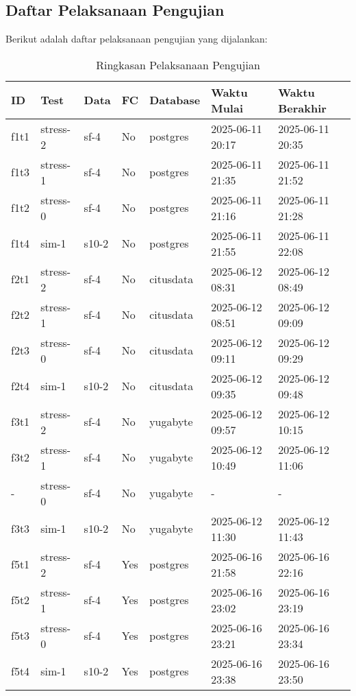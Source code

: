 \subsection{Daftar Pelaksanaan Pengujian}

Berikut adalah daftar pelaksanaan pengujian yang dijalankan:

\begin{table}[htbp]
    \centering
    \caption{Ringkasan Pelaksanaan Pengujian}
    \label{tab:execution-summary}
    \begin{tabular}{|l|l|l|l|l|l|l|}
        \hline
        \textbf{ID} & \textbf{Test} & \textbf{Data} & \textbf{FC} & \textbf{Database} & \textbf{Waktu Mulai} & \textbf{Waktu Berakhir} \\ \hline
        f1t1 & stress-2 & sf-4 & No & postgres & 2025-06-11 20:17 & 2025-06-11 20:35 \\ \hline
        f1t3 & stress-1 & sf-4 & No & postgres & 2025-06-11 21:35 & 2025-06-11 21:52 \\ \hline
        f1t2 & stress-0 & sf-4 & No & postgres & 2025-06-11 21:16 & 2025-06-11 21:28 \\ \hline
        f1t4 & sim-1 & s10-2 & No & postgres & 2025-06-11 21:55 & 2025-06-11 22:08 \\ \hline
        f2t1 & stress-2 & sf-4 & No & citusdata & 2025-06-12 08:31 & 2025-06-12 08:49 \\ \hline
        f2t2 & stress-1 & sf-4 & No & citusdata & 2025-06-12 08:51 & 2025-06-12 09:09 \\ \hline
        f2t3 & stress-0 & sf-4 & No & citusdata & 2025-06-12 09:11 & 2025-06-12 09:29 \\ \hline
        f2t4 & sim-1 & s10-2 & No & citusdata & 2025-06-12 09:35 & 2025-06-12 09:48 \\ \hline
        f3t1 & stress-2 & sf-4 & No & yugabyte & 2025-06-12 09:57 & 2025-06-12 10:15 \\ \hline
        f3t2 & stress-1 & sf-4 & No & yugabyte & 2025-06-12 10:49 & 2025-06-12 11:06 \\ \hline
        -    & stress-0 & sf-4 & No & yugabyte & - & - \\ \hline
        f3t3 & sim-1 & s10-2 & No & yugabyte & 2025-06-12 11:30 & 2025-06-12 11:43 \\ \hline
        f5t1 & stress-2 & sf-4 & Yes & postgres & 2025-06-16 21:58 & 2025-06-16 22:16 \\ \hline
        f5t2 & stress-1 & sf-4 & Yes & postgres & 2025-06-16 23:02 & 2025-06-16 23:19 \\ \hline
        f5t3 & stress-0 & sf-4 & Yes & postgres & 2025-06-16 23:21 & 2025-06-16 23:34 \\ \hline
        f5t4 & sim-1 & s10-2 & Yes & postgres & 2025-06-16 23:38 & 2025-06-16 23:50 \\ \hline
    \end{tabular}
\end{table}

